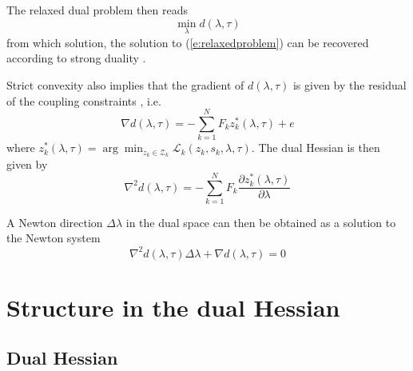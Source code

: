 The relaxed dual problem then reads
\begin{equation}
\min_{\lambda} d(\lambda, \tau)
\end{equation}
from which solution, the solution to (\ref{e:relaxedproblem}) can be recovered according to strong duality \cite{Boyd2004}.

Strict convexity also implies that the gradient of $d(\lambda, \tau)$ is given by the residual of the coupling constraints \cite{Bertsekas1989}, i.e.
\begin{equation}
\label{e:dualgradient}
\nabla d(\lambda, \tau) = -\sum_{k=1}^N F_k z_k^*(\lambda, \tau) + e
\end{equation}
where $z_k^*(\lambda, \tau) = \arg \min_{z_k \in \mathcal{Z}_k} \mathcal{L}_k(z_k, s_k, \lambda, \tau)$.
The dual Hessian is then given by
\begin{equation}
\label{e:dualhessian}
\nabla^2 d(\lambda, \tau) = -\sum_{k=1}^N F_k \frac{\partial z_k^*(\lambda, \tau)}{\partial \lambda}
\end{equation}

A Newton direction $\Delta \lambda$ in the dual space can then be obtained as a solution to the Newton system
\begin{equation}
\label{e:NewtonSystem}
\nabla^2 d(\lambda, \tau) \Delta \lambda + \nabla d(\lambda, \tau) = 0
\end{equation}

\section{Structure in the dual Hessian}

\subsection{Dual Hessian}

